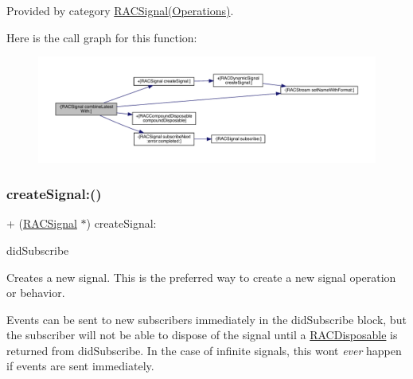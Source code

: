 Provided by category \mbox{\hyperlink{category_r_a_c_signal_07_operations_08_afab1b19558df566351cf87e466a5022f}{R\+A\+C\+Signal(\+Operations)}}.

Here is the call graph for this function\+:\nopagebreak
\begin{figure}[H]
\begin{center}
\leavevmode
\includegraphics[width=350pt]{interface_r_a_c_signal_afab1b19558df566351cf87e466a5022f_cgraph}
\end{center}
\end{figure}
\mbox{\label{interface_r_a_c_signal_a4ba374f148d6e2a0339c4f4202b4dc26}} 
\subsubsection{\texorpdfstring{create\+Signal\+:()}{createSignal:()}\hspace{0.1cm}{\footnotesize\ttfamily [1/3]}}
{\footnotesize\ttfamily + (\mbox{\hyperlink{interface_r_a_c_signal}{R\+A\+C\+Signal}} $\ast$) create\+Signal\+: \begin{DoxyParamCaption}\item[{(\mbox{\hyperlink{interface_r_a_c_disposable}{R\+A\+C\+Disposable}} $\ast$($^\wedge$)(id$<$ \mbox{\hyperlink{interface_r_a_c_subscriber}{R\+A\+C\+Subscriber}} $>$ subscriber))}]{did\+Subscribe }\end{DoxyParamCaption}}

Creates a new signal. This is the preferred way to create a new signal operation or behavior.

Events can be sent to new subscribers immediately in the {\ttfamily did\+Subscribe} block, but the subscriber will not be able to dispose of the signal until a \mbox{\hyperlink{interface_r_a_c_disposable}{R\+A\+C\+Disposable}} is returned from {\ttfamily did\+Subscribe}. In the case of infinite signals, this won\textquotesingle{}t {\itshape ever} happen if events are sent immediately.

